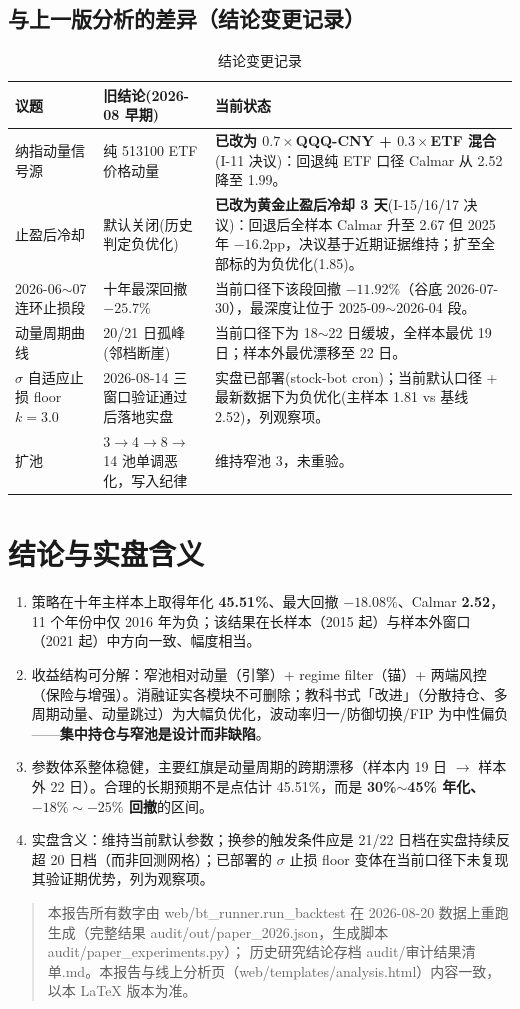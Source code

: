 \documentclass[11pt]{ctexart}
\newcommand{\red}[1]{\textcolor{accent}{#1}}   %
\begin{document}
\subsection{与上一版分析的差异（结论变更记录）}

\begin{table}[htbp]
\centering
\caption{结论变更记录}
\small
\begin{tabular}{p{2.8cm}p{4.6cm}p{7.6cm}}
\toprule
议题 & 旧结论(2026-08 早期) & 当前状态 \\
\midrule
纳指动量信号源 & 纯 513100 ETF 价格动量 & \textbf{已改为 $0.7\times$QQQ-CNY + $0.3\times$ETF 混合}(I-11 决议)：回退纯 ETF 口径 Calmar 从 2.52 降至 1.99。 \\
止盈后冷却 & 默认关闭(历史判定负优化) & \textbf{已改为黄金止盈后冷却 3 天}(I-15/16/17 决议)：回退后全样本 Calmar 升至 2.67 但 2025 年 $-16.2$pp，决议基于近期证据维持；扩至全部标的为负优化(1.85)。 \\
2026-06$\sim$07 连环止损段 & 十年最深回撤 $-25.7\%$ & 当前口径下该段回撤 $-11.92\%$（谷底 2026-07-30），最深度让位于 2025-09$\sim$2026-04 段。 \\
动量周期曲线 & 20/21 日孤峰(邻档断崖) & 当前口径下为 18$\sim$22 日缓坡，全样本最优 19 日；样本外最优漂移至 22 日。 \\
$\sigma$ 自适应止损 floor $k=3.0$ & 2026-08-14 三窗口验证通过后落地实盘 & 实盘已部署(stock-bot cron)；当前默认口径 + 最新数据下为负优化(主样本 1.81 vs 基线 2.52)，列观察项。 \\
扩池 & 3$\rightarrow$4$\rightarrow$8$\rightarrow$14 池单调恶化，写入纪律 & 维持窄池 3，未重验。 \\
\bottomrule
\end{tabular}
\end{table}

\section{结论与实盘含义}

\begin{enumerate}
  \item 策略在十年主样本上取得年化 \textbf{45.51\%}、最大回撤 \red{$-18.08\%$}、Calmar \textbf{2.52}，11 个年份中仅 2016 年为负；该结果在长样本（2015 起）与样本外窗口（2021 起）中方向一致、幅度相当。
  \item 收益结构可分解：窄池相对动量（引擎）+ regime filter（锚）+ 两端风控（保险与增强）。消融证实各模块不可删除；教科书式「改进」（分散持仓、多周期动量、动量跳过）为大幅负优化，波动率归一/防御切换/FIP 为中性偏负——\textbf{集中持仓与窄池是设计而非缺陷}。
  \item 参数体系整体稳健，主要红旗是动量周期的跨期漂移（样本内 19 日 $\rightarrow$ 样本外 22 日）。合理的长期预期不是点估计 45.51\%，而是 \textbf{30\%$\sim$45\% 年化、$-18\%\sim-25\%$ 回撤}的区间。
  \item 实盘含义：维持当前默认参数；换参的触发条件应是 21/22 日档在实盘持续反超 20 日档（而非回测网格）；已部署的 $\sigma$ 止损 floor 变体在当前口径下未复现其验证期优势，列为观察项。
\end{enumerate}

\begin{quote}\small
本报告所有数字由 web/bt\_runner.run\_backtest 在 2026-08-20 数据上重跑生成（完整结果 audit/out/paper\_2026.json，生成脚本 audit/paper\_experiments.py）；
历史研究结论存档 audit/审计结果清单.md。本报告与线上分析页（web/templates/analysis.html）内容一致，以本 LaTeX 版本为准。
\end{quote}
\end{document}
